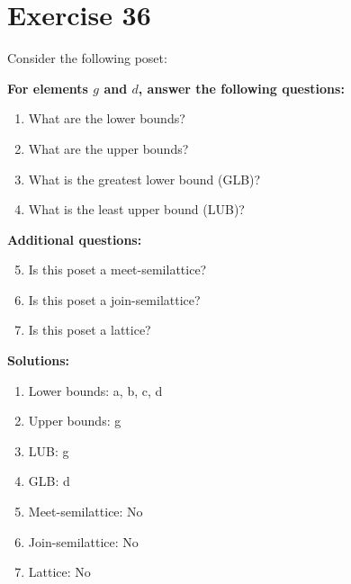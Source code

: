 \documentclass{article}
\begin{document}
\section*{Exercise 36}
Consider the following poset:
\begin{center}
\end{center}

    \textbf{For elements $g$ and $d$, answer the following questions:}
\begin{enumerate}
    \item What are the lower bounds?
    \item What are the upper bounds?
    \item What is the greatest lower bound (GLB)?
    \item What is the least upper bound (LUB)?
\end{enumerate}
    \hspace*{3ex} \textbf{Additional questions:}
\begin{enumerate}
    \setcounter{enumi}{4}
    \item Is this poset a meet-semilattice?
    \item Is this poset a join-semilattice?
    \item Is this poset a lattice?
\end{enumerate}

\textbf{Solutions:}
\begin{enumerate}
    \item Lower bounds: {a, b, c, d}
    \item Upper bounds: {g}
    \item LUB: g
    \item GLB: d
    \item Meet-semilattice: No
    \item Join-semilattice: No
    \item Lattice: No
\end{enumerate}
\newpage
\end{document}
